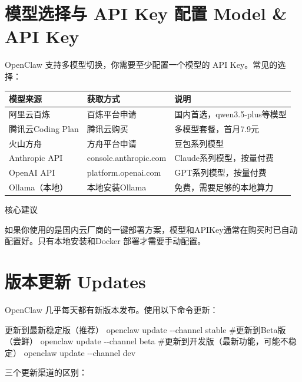 \documentclass[
  10
]{article}
\newenvironment{Shaded}{}{}
\newcommand{\NormalTok}[1]{#1}
\newcounter{none} %
\begin{document}
\section{模型选择与 API Key 配置 Model \& API
Key}\label{ux6a21ux578bux9009ux62e9ux4e0e-api-key-ux914dux7f6e-model-api-key}

OpenClaw 支持多模型切换，你需要至少配置一个模型的 API Key。常见的选择：

{\def\LTcaptype{none} %
\begin{longtable}[]{@{}|l|l|l|@{}}
\toprule\noalign{}
\endhead
\bottomrule\noalign{}
\endlastfoot
\hline
模型来源 & 获取方式 & 说明 \\
\hline
阿里云百炼 & 百炼平台申请 & 国内首选，qwen3.5-plus等模型 \\
\hline
腾讯云Coding Plan & 腾讯云购买 & 多模型套餐，首月7.9元 \\
\hline
火山方舟 & 方舟平台申请 & 豆包系列模型 \\
\hline
Anthropic API & console.anthropic.com & Claude系列模型，按量付费 \\
\hline
OpenAI API & platform.openai.com & GPT系列模型，按量付费 \\
\hline
Ollama（本地） & 本地安装Ollama & 免费，需要足够的本地算力 \\
\hline
\end{longtable}
}

核心建议

如果你使用的是国内云厂商的一键部署方案，模型和APIKey通常在购买时已自动配置好。只有本地安装和Docker
部署才需要手动配置。

\section{版本更新 Updates}\label{ux7248ux672cux66f4ux65b0-updates}

OpenClaw 几乎每天都有新版本发布。使用以下命令更新：

\begin{Shaded}
\begin{Highlighting}[]
\NormalTok{更新到最新稳定版（推荐）  }
\NormalTok{openclaw update {-}{-}channel stable  }
\NormalTok{\#更新到Beta版（尝鲜）  }
\NormalTok{openclaw update {-}{-}channel beta  }
\NormalTok{\#更新到开发版（最新功能，可能不稳定）  }
\NormalTok{openclaw update {-}{-}channel dev}
\end{Highlighting}
\end{Shaded}

三个更新渠道的区别：
\end{document}
